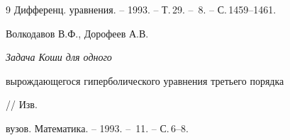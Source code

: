 \begin{thebibliography}{9}
Дифференц. уравнения. -- 1993. -- Т.\,29. -- \No\,8. -- С.\,1459--1461.




Волкодавов В.Ф., Дорофеев А.В. {\em Задача Коши для одного


вырождающегося гиперболического уравнения третьего порядка} // Изв.


вузов. Математика. -- 1993. -- \No\,11. -- С.\,6--8.








\end{thebibliography}





\vskip 2cm
















